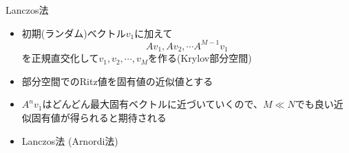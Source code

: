 \begin{frame}[t,fragile]{Lanczos法}
  \begin{itemize}
    \setlength{\itemsep}{1em}
  \item 初期(ランダム)ベクトル$v_1$に加えて
    \[
    Av_1, Av_2, \cdots A^{M-1}v_1
    \]
    を正規直交化して$v_1,v_2,\cdots,v_M$を作る(Krylov部分空間)
  \item 部分空間でのRitz値を固有値の近似値とする
  \item $A^nv_1$はどんどん最大固有ベクトルに近づいていくので、$M \ll N$でも良い近似固有値が得られると期待される
  \item Lanczos法 (Arnordi法)
  \end{itemize}
\end{frame}

